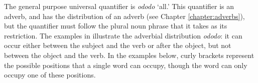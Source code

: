%
%
%
%
%
%
%
%
%
%
%
%
%
%
%
%	

The general purpose universal quantifier is \textit{ododo} `all.' This quantifier is an adverb, and has the distribution of an adverb (see Chapter \ref{chapter:adverbs}), but the quantifier must follow the plural noun phrase that it takes as its restriction. The examples in  illustrate the adverbial distribution \textit{ododo}: it can occur either between the subject and the verb or after the object, but not between the object and the verb. In the examples below, curly brackets represent the possible positions that a single word can occupy, though the word can only occupy one of these positions. 

